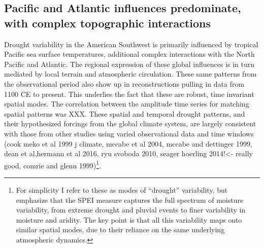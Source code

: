 \documentclass[11pt]{wlscirep}
\begin{document}
\subsection*{Pacific and Atlantic influences predominate, with complex topographic interactions}

Drought variability in the American Southwest is primarily influenced by tropical Pacific sea surface temperatures, additional complex interactions with the North Pacific and Atlantic. The regional expression of these global influences is in turn mediated by local terrain and atmospheric circulation. These same patterns from the observational period also show up in reconstructions pulling in data from 1100 CE to present. This underlies the fact that these are robust, time invariant spatial modes. The correlation between the amplitude time series for matching spatial patterns was XXX. These spatial and temporal drought patterns, and their hypothesized forcings from the global climate system, are largely consistent with those from other studies using varied observational data and time windows (cook meko et al 1999 j climate, mccabe et al 2004, mccabe and dettinger 1999, dean et al,hermann et al 2016, ryu svoboda 2010, seager hoerling 2014!<- really good, comrie and glenn 1999)\footnote{For simplicity I refer to these as modes of ``drought'' variability, but emphasize that the SPEI measure captures the full spectrum of moisture variability, from extreme drought and pluvial events to finer variability in moisture and aridity. The key point is that all this variability maps onto similar spatial modes, due to their reliance on the same underlying atmospheric dynamics.}.
\end{document}
